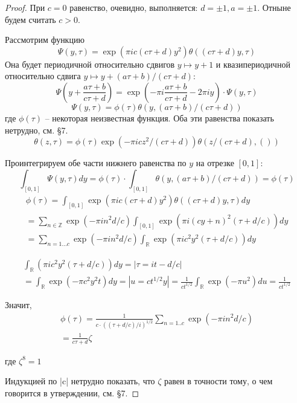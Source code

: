 \documentclass{article}
\newcommand{\ZZ}{\mathbb{Z}}
\newcommand{\RR}{\mathbb{R}}
\theoremstyle{break}
\begin{document}
\begin{proof}
	При $c=0$ равенство, очевидно, выполняется: $d=\pm 1, a=\pm 1$. 
	Отныне будем считать $c > 0$.
	
	Рассмотрим функцию
	\begin{equation}
		\Psi(y, \tau) = \exp(\pi i c (c\tau + d) y^2) \theta((c\tau + d)y, \tau)
	\end{equation}
	Она будет периодичной относительно сдвигов $y \mapsto y + 1$ и квазипериодичной относительно сдвига $y \mapsto y + (a\tau+b)/(c\tau + d)$:
	\begin{equation}
		\Psi(y + \frac{a\tau+b}{c\tau+d}) 
		= \exp(-\pi i \frac{a\tau+b}{c\tau+d} - 2\pi i y) \cdot \Psi(y, \tau)
	\end{equation}
	\begin{equation}
	\Psi(y, \tau) = \phi(\tau)\theta(y, (a\tau + b)/(c\tau+d))
	\end{equation}
	где $\phi(\tau)$ -- некоторая неизвестная функция.
	Оба эти равенства показать нетрудно, см. \cite{mumford} \S 7.
	\begin{equation}
	\theta(z, \tau)=\phi(\tau)\exp(-\pi i cz^2/(c\tau+d)) 
	\theta(z/(c\tau+d), ())
	\end{equation}
	
	Проинтегрируем обе части нижнего равенства по $y$ на отрезке $[0, 1]$:
	\begin{equation}
	\int_{[0, 1]} \Psi(y, \tau) dy 
	= \phi(\tau) \cdot \int_{[0, 1]} \theta(y, (a\tau+b)/(c\tau + d))
	= \phi(\tau)
	\end{equation}
	\begin{gather*}
	\phi(\tau)
	= \int_{[0, 1]} \exp(\pi i c (c\tau + d) y^2) \theta((c\tau+d)y, \tau) dy \\
	= \sum_{n \in \ZZ} \exp(-\pi i n^2 d/c)  
		\int_{[0, 1]} \exp(\pi i (cy + n)^2(\tau+d/c))dy \\
	= \sum_{n = 1...c} \exp(-\pi i n^2 d/c) 
		\int_{\RR} \exp(\pi i c^2 y^2 (\tau + d/c)) dy
	\end{gather*}

\begin{gather*}
	\int_{\RR}(\pi i c^2 y^2 (\tau + d/c)) dy = |\tau=it-d/c| \\
	=\int_{\RR}\exp(-\pi c^2 y^2 t) dy = |u=ct^{1/2}y|
	= \frac{1}{ct^{1/2}} \int_{\RR} \exp(-\pi u^2) du = \frac{1}{ct^{1/2}}
\end{gather*}

	Значит, 
\begin{gather*}
	\phi(\tau)
	= \frac{1}{c \cdot ((\tau+d/c)/i)^{1/2}} 
	\sum_{n=1..c} \exp(-\pi i n^2 d/c) \\
	= \frac{1}{c\tau+d} \zeta
\end{gather*}

	где $\zeta^8=1$
	
	Индукцией по |c| нетрудно показать, что 
	$\zeta$ равен в точности тому, о чем говорится в утверждении, см. \cite{mumford} \S 7.
\end{proof}
\end{document}
